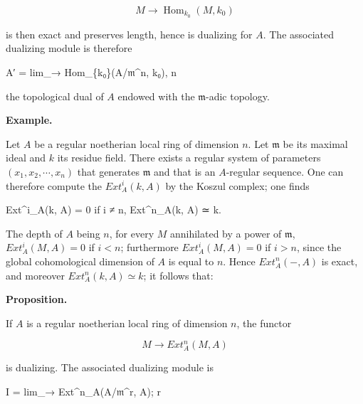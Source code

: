\documentclass[
]{article}
\newenvironment{Shaded}{}{}
\newcommand{\NormalTok}[1]{#1}
\begin{document}
\[
M \longrightarrow \operatorname{Hom}_{k_{0}}(M, k_{0})
\]

is then exact and preserves length, hence is dualizing for \(A\). The
associated dualizing module is therefore

\begin{Shaded}
\begin{Highlighting}[]
\NormalTok{A′ = lim\_→ Hom\_\{k₀\}(A/𝔪\^{}n, k₀),}
\NormalTok{       n}
\end{Highlighting}
\end{Shaded}

the topological dual of \(A\) endowed with the \(\mathfrak{m}\)-adic
topology.

\textbf{Example.}

Let \(A\) be a regular noetherian local ring of dimension \(n\). Let
\(\mathfrak{m}\) be its maximal ideal and \(k\) its residue field. There
exists a regular system of parameters \((x_{1}, x_{2}, \cdots, x_{n})\)
that generates \(\mathfrak{m}\) and that is an \(A\)-regular sequence.
One can therefore compute the \(Ext^{i}_{A}(k, A)\) by the Koszul
complex; one finds

\begin{Shaded}
\begin{Highlighting}[]
\NormalTok{Ext\^{}i\_A(k, A) = 0    if i ≠ n,}
\NormalTok{Ext\^{}n\_A(k, A) ≃ k.}
\end{Highlighting}
\end{Shaded}

The depth of \(A\) being \(n\), for every \(M\) annihilated by a power
of \(\mathfrak{m}\), \(Ext^{i}_{A}(M, A) = 0\) if \(i < n\); furthermore
\(Ext^{i}_{A}(M, A) = 0\) if \(i > n\), since the global cohomological
dimension of \(A\) is equal to \(n\). Hence \(Ext^{n}_{A}(-, A)\) is
exact, and moreover \(Ext^{n}_{A}(k, A) \simeq k\); it follows that:

\textbf{Proposition.}

If \(A\) is a regular noetherian local ring of dimension \(n\), the
functor

\[
M \longrightarrow Ext^{n}_{A}(M, A)
\]

is dualizing. The associated dualizing module is

\begin{Shaded}
\begin{Highlighting}[]
\NormalTok{I = lim\_→ Ext\^{}n\_A(A/𝔪\^{}r, A);}
\NormalTok{      r}
\end{Highlighting}
\end{Shaded}
\end{document}
